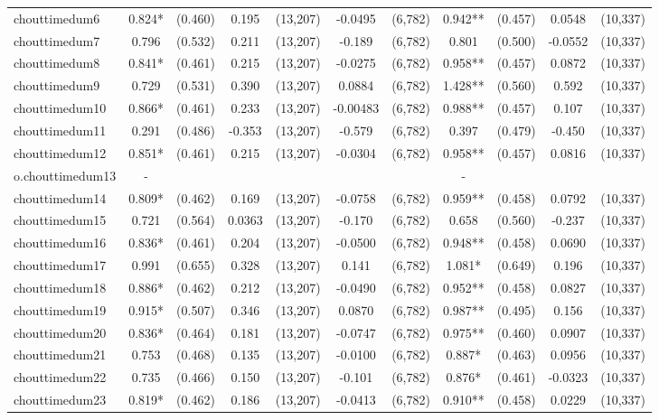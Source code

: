 \documentclass[]{article}
\begin{document}
\begin{tabular}{lcccccccccc}
chouttimedum6 & 0.824* & (0.460) & 0.195 & (13,207) & -0.0495 & (6,782) & 0.942** & (0.457) & 0.0548 & (10,337) \\
chouttimedum7 & 0.796 & (0.532) & 0.211 & (13,207) & -0.189 & (6,782) & 0.801 & (0.500) & -0.0552 & (10,337) \\
chouttimedum8 & 0.841* & (0.461) & 0.215 & (13,207) & -0.0275 & (6,782) & 0.958** & (0.457) & 0.0872 & (10,337) \\
chouttimedum9 & 0.729 & (0.531) & 0.390 & (13,207) & 0.0884 & (6,782) & 1.428** & (0.560) & 0.592 & (10,337) \\
chouttimedum10 & 0.866* & (0.461) & 0.233 & (13,207) & -0.00483 & (6,782) & 0.988** & (0.457) & 0.107 & (10,337) \\
chouttimedum11 & 0.291 & (0.486) & -0.353 & (13,207) & -0.579 & (6,782) & 0.397 & (0.479) & -0.450 & (10,337) \\
chouttimedum12 & 0.851* & (0.461) & 0.215 & (13,207) & -0.0304 & (6,782) & 0.958** & (0.457) & 0.0816 & (10,337) \\
o.chouttimedum13 & - &  &  &  &  &  & - &  &  &  \\
chouttimedum14 & 0.809* & (0.462) & 0.169 & (13,207) & -0.0758 & (6,782) & 0.959** & (0.458) & 0.0792 & (10,337) \\
chouttimedum15 & 0.721 & (0.564) & 0.0363 & (13,207) & -0.170 & (6,782) & 0.658 & (0.560) & -0.237 & (10,337) \\
chouttimedum16 & 0.836* & (0.461) & 0.204 & (13,207) & -0.0500 & (6,782) & 0.948** & (0.458) & 0.0690 & (10,337) \\
chouttimedum17 & 0.991 & (0.655) & 0.328 & (13,207) & 0.141 & (6,782) & 1.081* & (0.649) & 0.196 & (10,337) \\
chouttimedum18 & 0.886* & (0.462) & 0.212 & (13,207) & -0.0490 & (6,782) & 0.952** & (0.458) & 0.0827 & (10,337) \\
chouttimedum19 & 0.915* & (0.507) & 0.346 & (13,207) & 0.0870 & (6,782) & 0.987** & (0.495) & 0.156 & (10,337) \\
chouttimedum20 & 0.836* & (0.464) & 0.181 & (13,207) & -0.0747 & (6,782) & 0.975** & (0.460) & 0.0907 & (10,337) \\
chouttimedum21 & 0.753 & (0.468) & 0.135 & (13,207) & -0.0100 & (6,782) & 0.887* & (0.463) & 0.0956 & (10,337) \\
chouttimedum22 & 0.735 & (0.466) & 0.150 & (13,207) & -0.101 & (6,782) & 0.876* & (0.461) & -0.0323 & (10,337) \\
chouttimedum23 & 0.819* & (0.462) & 0.186 & (13,207) & -0.0413 & (6,782) & 0.910** & (0.458) & 0.0229 & (10,337) \\

\end{tabular}
\end{document}
